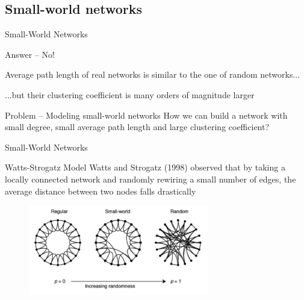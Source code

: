 \subsection{Small-world networks}

\begin{frame}{Small-World Networks}

\begin{block}{Answer -- No!}
\BI
\item Average path length of real networks is similar to the one of random networks...
\item ...but their clustering coefficient is many orders of magnitude larger
\EI
\end{block}

\bigskip
\begin{block}{Problem -- Modeling \alert{small-world} networks}
How we can build a network with \alert{small degree}, \alert{small
average path length} and \alert{large clustering coefficient}?
\end{block}

\end{frame}

\begin{frame}{Small-World Networks}

\begin{block}{Watts-Strogatz Model}
Watts and Strogatz (1998) observed that by taking a locally connected 
network and randomly rewiring a small number of edges, the average distance 
between two nodes falls drastically
\end{block}

\begin{figure}
	\includegraphics[width=0.7\textwidth]{watts}
\end{figure}

\end{frame}

